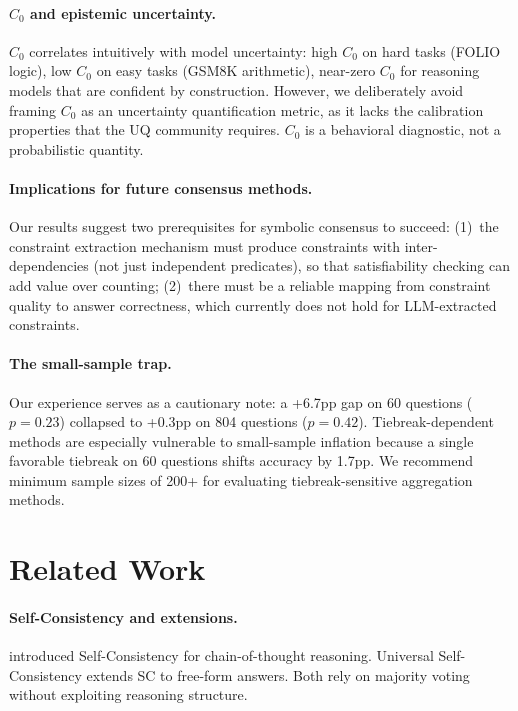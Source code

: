 \documentclass[11pt,a4paper]{article}
\begin{document}
\paragraph{$C_0$ and epistemic uncertainty.}
$C_0$ correlates intuitively with model uncertainty: high $C_0$ on hard tasks (FOLIO logic), low $C_0$ on easy tasks (GSM8K arithmetic), near-zero $C_0$ for reasoning models that are confident by construction.
However, we deliberately avoid framing $C_0$ as an uncertainty quantification metric, as it lacks the calibration properties that the UQ community requires.
$C_0$ is a behavioral diagnostic, not a probabilistic quantity.

\paragraph{Implications for future consensus methods.}
Our results suggest two prerequisites for symbolic consensus to succeed:
(1)~the constraint extraction mechanism must produce constraints with inter-dependencies (not just independent predicates), so that satisfiability checking can add value over counting;
(2)~there must be a reliable mapping from constraint quality to answer correctness, which currently does not hold for LLM-extracted constraints.

\paragraph{The small-sample trap.}
Our experience serves as a cautionary note: a +6.7pp gap on 60 questions ($p=0.23$) collapsed to +0.3pp on 804 questions ($p=0.42$).
Tiebreak-dependent methods are especially vulnerable to small-sample inflation because a single favorable tiebreak on 60 questions shifts accuracy by 1.7pp.
We recommend minimum sample sizes of 200+ for evaluating tiebreak-sensitive aggregation methods.

\section{Related Work}
\label{sec:related}

\paragraph{Self-Consistency and extensions.}
\citet{wang2023selfconsistency} introduced Self-Consistency for chain-of-thought reasoning.
Universal Self-Consistency \cite{chen2023universal} extends SC to free-form answers.
Both rely on majority voting without exploiting reasoning structure.
\end{document}
